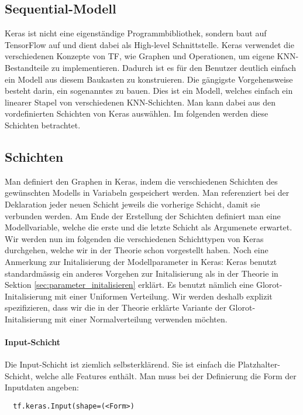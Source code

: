 \subsection{Sequential-Modell}
Keras ist nicht eine eigenständige Programmbibliothek, sondern baut auf
TensorFlow auf und dient dabei als High-level Schnittstelle.
Keras verwendet die verschiedenen Konzepte von TF, wie Graphen und Operationen,
um eigene KNN-Bestandteile zu implementieren.
Dadurch ist es für den Benutzer deutlich einfach ein Modell aus diesem Baukasten
zu konstruieren.
\para{}
Die gängigste Vorgehensweise besteht darin, ein sogenanntes
 zu bauen.
Dies ist ein Modell, welches einfach ein linearer Stapel von verschiedenen
KNN-Schichten. Man kann dabei aus den vordefinierten Schichten von Keras
auswählen. Im folgenden werden diese Schichten betrachtet.

\subsection{Schichten}
Man definiert den Graphen in Keras, indem die verschiedenen Schichten des
gewünschten Modells in Variabeln gespeichert werden. Man referenziert bei der
Deklaration jeder neuen Schicht jeweils die vorherige Schicht, damit sie
verbunden werden.
Am Ende der Erstellung der Schichten definiert man eine Modellvariable, welche
die erste und die letzte Schicht als Argumenete erwartet.
\para{}
Wir werden nun im folgenden die verschiedenen Schichttypen von Keras durchgehen, welche wir in
der Theorie schon vorgestellt haben.
\para{}
Noch eine Anmerkung zur Initalisierung der Modellparameter in Keras:
Keras benutzt standardmässig ein
anderes Vorgehen zur Initalisierung als in der Theorie in Sektion
\ref{sec:parameter_initalisieren} erklärt.
Es benutzt nämlich eine Glorot-Initalisierung mit einer Uniformen Verteilung.
Wir werden deshalb explizit spezifizieren, dass wir die in der Theorie erklärte
Variante der Glorot-Initalisierung mit einer Normalverteilung verwenden möchten.
\para{}

\cite{net:keras_init}

\paragraph{Input-Schicht}
Die Input-Schicht ist ziemlich selbsterklärend. Sie ist einfach die
Platzhalter-Schicht, welche alle Features enthält.
Man muss bei der Definierung die Form der Inputdaten angeben:
\begin{verbatim}
  tf.keras.Input(shape=(<Form>)
\end{verbatim}

